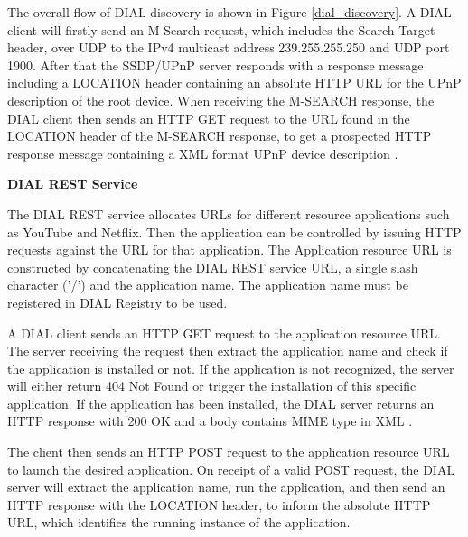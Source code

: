 The overall flow of DIAL discovery is shown in Figure \ref{dial_discovery}. A
DIAL client will firstly send an M-Search request, which includes  the Search
Target header, over UDP to the IPv4 multicast address 239.255.255.250 and UDP
port 1900. After that the SSDP/UPnP server responds with a response message
including a LOCATION header containing an absolute HTTP URL for the UPnP
description of the root device. When receiving the M-SEARCH response, the DIAL
client then sends an HTTP GET request to the URL found in the LOCATION header
of the M-SEARCH response, to get a prospected HTTP response message containing
a XML format UPnP device description \cite{dial}. 

\textbf{DIAL REST Service}

The DIAL REST service allocates URLs for different resource applications such as 
YouTube and Netflix. Then the application can be controlled by issuing HTTP 
requests against the URL for that application. The Application resource URL is 
constructed by concatenating the DIAL REST service URL, a single slash character 
('/') and the application name. The application name must be registered in DIAL 
Registry to be used.

A DIAL client sends an HTTP GET request to the application resource URL. 
The server receiving the request then extract the application name and check if the 
application is installed or not. If the application is not recognized, the 
server will either return 404 Not Found or trigger the installation of this specific 
application. If the application has been installed, the DIAL server returns 
an HTTP response with 200 OK and a body contains MIME type in XML \cite{dial}.

The client then sends an HTTP POST request to the application resource URL to 
launch the desired application. On receipt of a valid POST request, the DIAL 
server will extract the application name, run the application, and then send 
an HTTP response with the LOCATION header, to inform the absolute HTTP URL, which 
identifies the running instance of the application.

